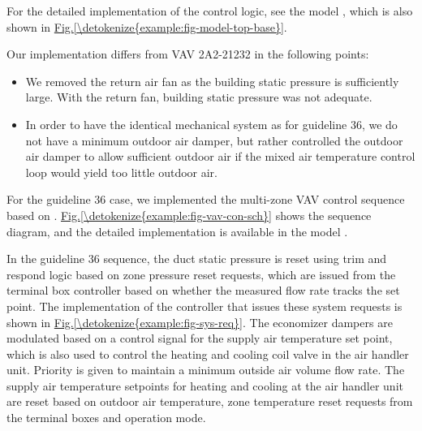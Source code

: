 \documentclass[letterpaper,10pt, openany,english]{sphinxmanual}
\begin{document}
For the detailed implementation of the control logic,
see the model ,
which is also shown in \hyperref[\detokenize{example:fig-model-top-base}]{Fig.\@ \ref{\detokenize{example:fig-model-top-base}}}.

Our implementation differs from VAV 2A2-21232 in the following points:
\begin{itemize}
\item {} 
We removed the return air fan as the building static pressure is sufficiently
large. With the return fan, building static pressure was not adequate.

\item {} 
In order to have the identical mechanical system as for guideline 36,
we do not have a minimum outdoor air damper, but rather controlled
the outdoor air damper to allow sufficient outdoor air
if the mixed air temperature control loop would yield too little outdoor
air.

\end{itemize}

For the guideline 36 case, we implemented the multi-zone VAV control sequence
based on .
\hyperref[\detokenize{example:fig-vav-con-sch}]{Fig.\@ \ref{\detokenize{example:fig-vav-con-sch}}} shows the sequence diagram, and the detailed implementation
is available in the model .

In the guideline 36 sequence, the duct static pressure is reset using trim and respond
logic based on zone pressure reset requests, which are issued from the terminal box
controller based on whether the measured flow rate tracks the set point.
The implementation of the controller that issues these system requests
is shown in \hyperref[\detokenize{example:fig-sys-req}]{Fig.\@ \ref{\detokenize{example:fig-sys-req}}}.
The economizer dampers are modulated based on a control signal for the supply
air temperature set point, which is also used to control the heating and cooling coil valve
in the air handler unit.
Priority is given to maintain a minimum outside air volume flow rate.
The supply air temperature setpoints for heating and cooling at the air handler unit
are reset based on outdoor air temperature, zone temperature reset requests from
the terminal boxes and operation mode.
\end{document}
